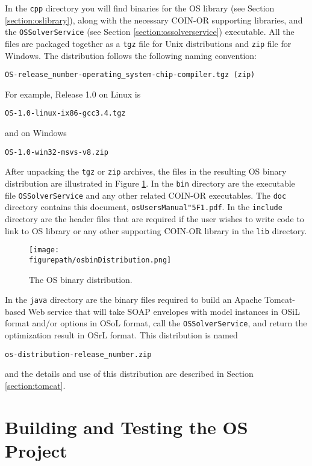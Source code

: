 \documentclass[11pt]{article}
\newcommand{\figurepath}{./figures}
\newcounter{Fig}
\renewcommand{\_}{{\char"5F}}
\renewcommand{\{}{{\char"7B}}
\renewcommand{\}}{{\char"7D}}
\renewcommand{\^}{{\char"0D}}
\renewcommand{\'}{{\char"0D}}
\begin{document}
In the {\tt cpp} directory you will find binaries for the OS library (see Section \ref{section:oslibrary}), along with the necessary COIN-OR supporting libraries,  and the {\tt OSSolverService} (see Section \ref{section:ossolverservice})  executable.   All the files are packaged together as a {\tt tgz} file for Unix distributions and {\tt zip} file for Windows.  The distribution follows the following naming convention:

\begin{verbatim}
OS-release_number-operating_system-chip-compiler.tgz (zip)
\end{verbatim}
For example, Release 1.0 on Linux is
\begin{verbatim}
OS-1.0-linux-ix86-gcc3.4.tgz
\end{verbatim}
and on Windows
\begin{verbatim}
OS-1.0-win32-msvs-v8.zip
\end{verbatim}
After unpacking the {\tt tgz} or {\tt zip} archives, the files in the resulting OS binary distribution are illustrated in Figure \ref{figure:osbindistribution}.   In the {\tt bin} directory are the executable file {\tt OSSolverService}  and any other related COIN-OR executables. The {\tt doc} directory contains this document, {\tt osUsersManual\_1.pdf}.
  In the {\tt include} directory are the header files that are required if the user wishes to write code to link to OS library or any other supporting COIN-OR library in the {\tt lib} directory.
\begin{figure}
\centering
\texttt{[image: \\figurepath/osbinDistribution.png]}
\caption{The OS  binary distribution.}
\label{figure:osbindistribution}
\end{figure}

In the {\tt java} directory  are the binary files required to build an Apache Tomcat-based Web service that will take SOAP envelopes with model instances in OSiL format and/or options in OSoL format, call the {\tt OSSolverService}, and return the optimization result in OSrL format.  This distribution is named
\begin{verbatim}
os-distribution-release_number.zip
\end{verbatim}
and the details and use of this distribution are described in Section \ref{section:tomcat}.



\section{Building and Testing the OS Project}\label{section:build}
\end{document}
